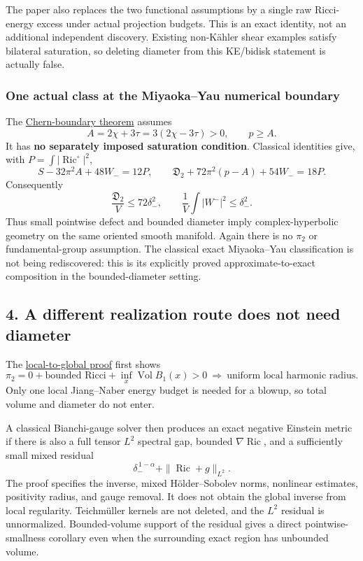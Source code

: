 \documentclass[
  11pt,
]{article}
\begin{document}
The paper also replaces the two functional assumptions by a single raw
Ricci-energy excess under actual projection budgets. This is an exact
identity, not an additional independent discovery. Existing non-Kähler
shear examples satisfy bilateral saturation, so deleting diameter from
this KE/bidisk statement is actually false.

\hypertarget{one-actual-class-at-the-miyaokayau-numerical-boundary}{%
\subsubsection{One actual class at the Miyaoka--Yau numerical
boundary}\label{one-actual-class-at-the-miyaokayau-numerical-boundary}}

The \href{20260924_chern_boundary_realization.md}{Chern-boundary
theorem} assumes \[
 A=2\chi+3\tau=3(2\chi-3\tau)>0,\qquad p\ge A.
\] It has \textbf{no separately imposed saturation condition}. Classical
identities give, with \(P=\int|\operatorname{Ric}^{\circ}|^2\), \[
 S-32\pi^2A+48W_-=12P,\qquad
 \mathfrak D_2+72\pi^2(p-A)+54W_-=18P.
\] Consequently \[
 \frac{\mathfrak D_2}{V}\le72\delta_-^2,\qquad
 \frac1V\int|W^-|^2\le\delta_-^2.
\] Thus small pointwise defect and bounded diameter imply
complex-hyperbolic geometry on the same oriented smooth manifold. Again
there is no \(\pi_2\) or fundamental-group assumption. The classical
exact Miyaoka--Yau classification is not being rediscovered: this is its
explicitly proved approximate-to-exact composition in the
bounded-diameter setting.

\hypertarget{a-different-realization-route-does-not-need-diameter}{%
\subsection{4. A different realization route does not need
diameter}\label{a-different-realization-route-does-not-need-diameter}}

The \href{20260924_local_to_global_scope.md}{local-to-global proof}
first shows \[
 \pi_2=0+\text{bounded Ricci}+\inf_x\operatorname{Vol}B_1(x)>0
 \ \Longrightarrow\ \text{uniform local harmonic radius}.       \tag{2}
\] Only one local Jiang--Naber energy budget is needed for a blowup, so
total volume and diameter do not enter.

A classical Bianchi-gauge solver then produces an exact negative
Einstein metric if there is also a full tensor \(L^2\) spectral gap,
bounded \(\nabla\operatorname{Ric}\), and a sufficiently small mixed
residual \[
 \delta_-^{\,1-\alpha}+\|\operatorname{Ric}+g\|_{L^2}.
\] The proof specifies the inverse, mixed Hölder--Sobolev norms,
nonlinear estimates, positivity radius, and gauge removal. It does not
obtain the global inverse from local regularity. Teichmüller kernels are
not deleted, and the \(L^2\) residual is unnormalized. Bounded-volume
support of the residual gives a direct pointwise-smallness corollary
even when the surrounding exact region has unbounded volume.
\end{document}
